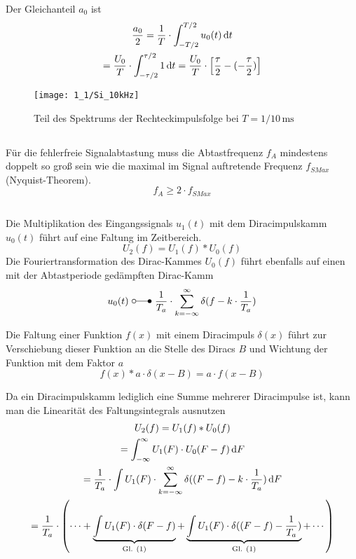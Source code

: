 \documentclass[a4paper, 12pt]{article}
\begin{document}
Der Gleichanteil $a_0$ ist
\begin{gather*}
  \frac{a_0}{2} = \frac{1}{T} \cdot \int_{-T/2}^{T/2}{u_0(t) \mathop{}\!\mathrm{d} t}\\
  = \frac{U_0}{T} \cdot \int_{-\tau/2}^{\tau/2}{ 1 \mathop{}\!\mathrm{d} t} = \frac{U_0}{T} \cdot
  \left[ \frac{\tau}{2} - (- \frac{\tau}{2}) \right] 
\end{gather*}

\begin{figure}[H]
	\texttt{[image: 1\_1/Si\_10kHz]}
  \caption{Teil des Spektrums der Rechteckimpulsfolge bei $T=1/10\,\si{\milli\second}$}
\end{figure}

\subsection{}
Für die fehlerfreie Signalabtastung muss die Abtastfrequenz $f_A$ mindestens
doppelt so groß sein wie die maximal im Signal auftretende Frequenz $f_{SMax}$ (Nyquist-Theorem).
\[
  f_A \geq 2\cdot f_{SMax}
\]


\subsection{}

Die Multiplikation des Eingangssignals $u_1(t)$ mit dem Diracimpulskamm $u_0(t)$
führt auf eine Faltung im Zeitbereich.
\[
U_2(f) = U_1(f) * U_0(f)
\]
Die Fouriertransformation des Dirac-Kammes $U_0(f)$
führt ebenfalls auf einen mit der Abtastperiode gedämpften Dirac-Kamm
\[
  u_0(t) \,\, \laplace \,\, \frac{1}{T_a} \cdot \sum_{k=-\infty}^{\infty}{\delta{(f - k
      \cdot \frac{1}{T_a})}}
\]

Die Faltung einer Funktion $f(x)$ mit einem Diracimpuls $\delta(x)$ führt zur Verschiebung dieser
Funktion an die Stelle des Diracs $B$ und Wichtung der Funktion mit dem Faktor $a$
\begin{equation}
\label{eq:1}
  f(x) * a \cdot \delta(x - B) = a \cdot f(x - B)
\end{equation}

Da ein Diracimpulskamm lediglich eine Summe mehrerer Diracimpulse ist, kann man
die Linearität des Faltungsintegrals ausnutzen
\begin{gather*}
  U_2(f) = U_1(f) * U_0(f)\\
  = \int_{-\infty}^{\infty}{U_1(F) \cdot U_0(F - f) \mathop{}\!\mathrm{d} F}\\  
  = \frac{1}{T_a} \cdot \int{U_1(F) \cdot \sum_{k=-\infty}^{\infty}{\delta((F-f) - k
      \cdot \frac{1}{T_a})} \mathop{}\!\mathrm{d}F }\\
  = \frac{1}{T_a} \cdot \left( \cdots + \underbrace{
      \int{U_1(F) \cdot \delta{(F-f)}}
    }_{\textrm{Gl. } (1)}
    +
    \underbrace{
      \int{U_1(F) \cdot \delta{((F-f) - \frac{1}{T_a})}}
      }_{\textrm{Gl. } (1)}
      + \cdots \right)
\end{gather*}
\end{document}
